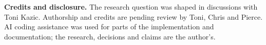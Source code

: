\documentclass[11pt]{article}
\begin{document}
\textbf{Credits and disclosure.} The research question was shaped in discussions with Toni Kazic. Authorship and
credits are pending review by Toni, Chris and Pierce. AI coding assistance was used for parts of the implementation
and documentation; the research, decisions and claims are the author's.
\end{document}
